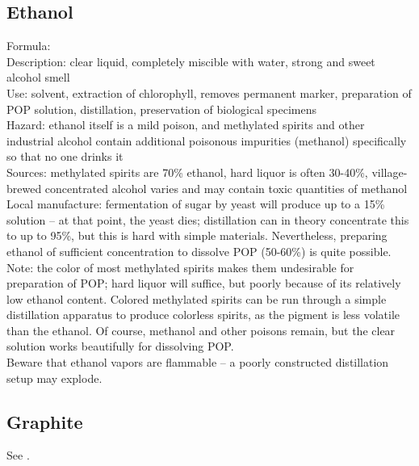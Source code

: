 \subsection{Ethanol}
Formula: \\
Description: clear liquid, 
completely miscible with water, 
strong and sweet alcohol smell\\
Use: solvent, 
extraction of chlorophyll, 
removes permanent marker, 
preparation of POP solution, 
distillation, 
preservation of biological specimens\\
Hazard: ethanol itself is a mild poison, 
and methylated spirits and other industrial alcohol contain 
additional poisonous impurities (methanol) 
specifically so that no one drinks it\\
Sources: methylated spirits are 70\% ethanol, 
hard liquor is often 30-40\%, 
village-brewed concentrated alcohol varies 
and may contain toxic quantities of methanol\\
Local manufacture: fermentation of sugar by yeast will produce 
up to a 15\% solution -- at that point, 
the yeast dies; 
distillation can in theory concentrate this to up to 95\%, 
but this is hard with simple materials. 
Nevertheless, 
preparing ethanol of sufficient concentration to dissolve POP (50-60\%) 
is quite possible.\\
Note: the color of most methylated spirits makes them undesirable 
for preparation of POP; 
hard liquor will suffice, 
but poorly because of its relatively low ethanol content. 
Colored methylated spirits can be run 
through a simple distillation apparatus to produce colorless spirits, 
as the pigment is less volatile than the ethanol. 
Of course, 
methanol and other poisons remain, 
but the clear solution works beautifully for dissolving POP.\\ 
Beware that ethanol vapors are flammable -- 
a poorly constructed distillation setup may explode.
\subsection{Graphite}
See .
